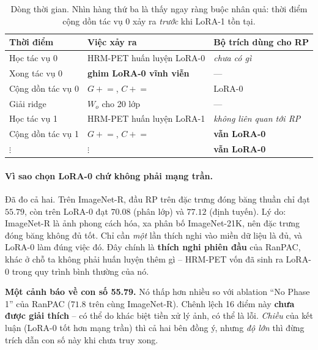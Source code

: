 \documentclass[11pt,a4paper]{article}
\newenvironment{luuy}{\begin{leftbar}\noindent\ignorespaces}{\end{leftbar}}
\begin{document}
\begin{table}[htbp]
\centering
\caption{Dòng thời gian. Nhìn hàng thứ ba là thấy ngay ràng buộc nhân quả: thời
điểm cộng dồn tác vụ 0 xảy ra \emph{trước} khi LoRA-1 tồn tại.}
\label{tab:dong-thoi-gian}
\begin{tabular}{@{}lll@{}}
\toprule
Thời điểm & Việc xảy ra & Bộ trích dùng cho RP \\
\midrule
Học tác vụ 0     & HRM-PET huấn luyện LoRA-0     & \emph{chưa có gì} \\
Xong tác vụ 0    & \textbf{ghim LoRA-0 vĩnh viễn} & --- \\
Cộng dồn tác vụ 0 & $G \mathrel{+}=$, $C \mathrel{+}=$ & LoRA-0 \\
Giải ridge       & $W_o$ cho 20 lớp              & --- \\
Học tác vụ 1     & HRM-PET huấn luyện LoRA-1     & \emph{không liên quan tới RP} \\
Cộng dồn tác vụ 1 & $G \mathrel{+}=$, $C \mathrel{+}=$ & \textbf{vẫn LoRA-0} \\
$\vdots$         & $\vdots$                      & \textbf{vẫn LoRA-0} \\
\bottomrule
\end{tabular}
\end{table}

\paragraph{Vì sao chọn LoRA-0 chứ không phải mạng trần.}
Đã đo cả hai. Trên ImageNet-R, đầu RP trên đặc trưng đóng băng thuần chỉ đạt
$55.79$, còn trên LoRA-0 đạt $70.08$ (phân lớp) và $77.12$ (định tuyến). Lý do:
ImageNet-R là ảnh phong cách hóa, xa phân bố ImageNet-21K, nên đặc trưng đóng
băng không đủ tốt. Chỉ cần \emph{một} lần thích nghi vào miền dữ liệu là đủ, và
LoRA-0 làm đúng việc đó. Đây chính là \textbf{thích nghi phiên đầu} của RanPAC,
khác ở chỗ ta không phải huấn luyện thêm gì -- HRM-PET vốn đã sinh ra LoRA-0
trong quy trình bình thường của nó.

\begin{luuy}
\textbf{Một cảnh báo về con số 55.79.} Nó thấp hơn nhiều so với ablation ``No
Phase 1'' của RanPAC ($71.8$ trên cùng ImageNet-R). Chênh lệch 16 điểm này
\textbf{chưa được giải thích} -- có thể do khác biệt tiền xử lý ảnh, có thể là
lỗi. \emph{Chiều} của kết luận (LoRA-0 tốt hơn mạng trần) thì cả hai bên đồng ý,
nhưng \emph{độ lớn} thì đừng trích dẫn con số này khi chưa truy xong.
\end{luuy}
\end{document}
